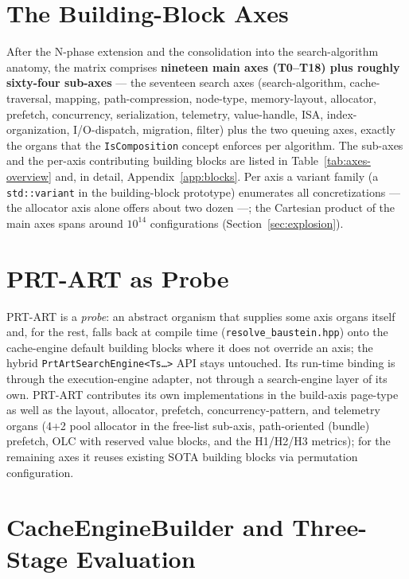 \section{The Building-Block Axes}\label{sec:axes}

After the N-phase extension and the consolidation into the search-algorithm anatomy, the matrix
comprises \textbf{nineteen main axes (T0--T18) plus roughly sixty-four sub-axes} --- the seventeen
search axes (search-algorithm, cache-traversal, mapping, path-compression, node-type, memory-layout,
allocator, prefetch, concurrency, serialization, telemetry, value-handle, ISA, index-organization,
I/O-dispatch, migration, filter) plus the two queuing axes, exactly the organs that the
\texttt{IsComposition} concept enforces per algorithm. The sub-axes and the per-axis contributing
building blocks are listed in Table~\ref{tab:axes-overview} and, in detail, Appendix~\ref{app:blocks}.
Per axis a variant family (a \texttt{std::variant} in the building-block prototype) enumerates all
concretizations --- the allocator axis alone offers about two dozen ---; the Cartesian product of the
main axes spans around $10^{14}$ configurations (Section~\ref{sec:explosion}).

\section{PRT-ART as Probe}\label{sec:prt-art}

PRT-ART is a \emph{probe}: an abstract organism that supplies some axis organs itself and, for the
rest, falls back at compile time (\texttt{resolve\_baustein.hpp}) onto the cache-engine default
building blocks where it does not override an axis; the hybrid
\texttt{PrtArtSearchEngine<Ts\ldots>} API stays untouched. Its run-time binding is through the
execution-engine adapter, not through a search-engine layer of its own. PRT-ART contributes its
own implementations in the build-axis page-type as well as the layout, allocator, prefetch,
concurrency-pattern, and telemetry organs (4+2 pool allocator in the free-list sub-axis, path-oriented (bundle) prefetch, OLC with reserved value blocks, and the
H1/H2/H3 metrics); for the remaining axes it reuses existing SOTA building blocks via permutation
configuration.

\section{CacheEngineBuilder and Three-Stage Evaluation}\label{sec:builder}

